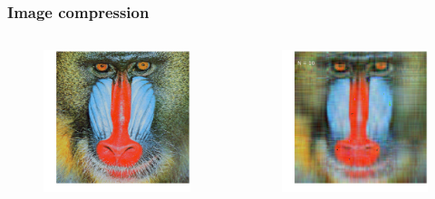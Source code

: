 \documentclass[xcolor={dvipsnames}]{beamer}
\begin{document}
\begin{frame}
\frametitle{Image compression}
\begin{columns}
\hspace{-0.25in}
\begin{figure}
\includegraphics[width=\textwidth]{figs/mandrill.png}
\end{figure}
\begin{figure}
\includegraphics[width=\textwidth]{figs/mandrill-10.png}
\end{figure}
\end{columns}
\end{frame}
\end{document}
